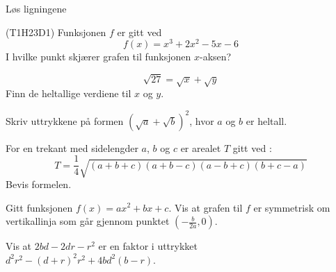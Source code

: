 Løs ligningene


\newpage
{} (T1H23D1)\os
Funksjonen $ f $ er gitt ved
\[ f(x)=x^3+2x^2-5x-6\]
I hvilke punkt skjærer grafen til funksjonen $ x $-aksen?

 \vs
\[ \sqrt{27}=\sqrt{x}+\sqrt{y} \]
Finn de heltallige verdiene til $ x $ og $ y $.

Skriv uttrykkene på formen $ \left(\sqrt{a}+\sqrt{b}\right)^2 $, hvor $ a $ og $ b $ er heltall.

For en trekant med sidelengder $ a $, $ b $ og $ c $ er arealet $ T $ gitt ved :
\[ T=\frac{1}{4}\sqrt{(a+b+c)(a+b-c)(a-b+c)(b+c-a)} \]
Bevis formelen.

Gitt funksjonen  ${f(x)=a x^2+bx +c} $. Vis at grafen til $ f $ er symmetrisk om vertikallinja som går gjennom punktet $ \left(-\frac{b}{2a}, 0\right) $.

Vis at $ 2bd-2dr-r^2 $ er en faktor i uttrykket\\ $ d^2  r^2-(d+r)^2  r^2+4b d^2 (b-r) $.
